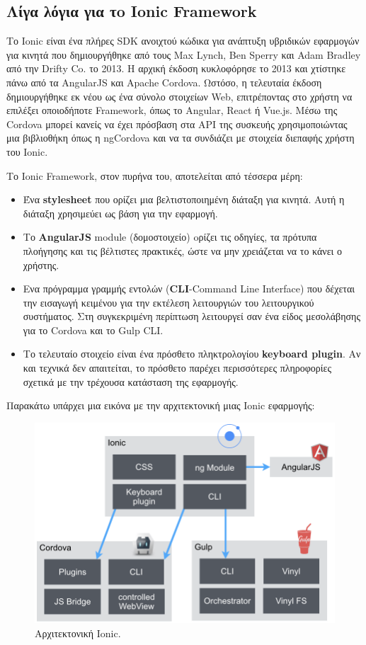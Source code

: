 \documentclass[a4paper,12pt]{article}
\begin{document}
		\subsection{Λίγα λόγια για τo Ionic Framework}
			Το Ionic είναι ένα πλήρες SDK ανοιχτού κώδικα για ανάπτυξη υβριδικών εφαρμογών για κινητά που δημιουργήθηκε από τους Max Lynch, Ben Sperry και Adam Bradley από την Drifty Co. το 
			2013. Η αρχική έκδοση κυκλοφόρησε το 2013 και χτίστηκε πάνω από τα AngularJS και Apache Cordova. Ωστόσο, η τελευταία έκδοση δημιουργήθηκε εκ νέου ως ένα σύνολο στοιχείων Web, 
			επιτρέποντας στο χρήστη να επιλέξει οποιοδήποτε Framework, όπως το Angular, React ή Vue.js. Μέσω της Cordova μπορεί κανείς να έχει πρόσβαση στα API της συσκευής χρησιμοποιώντας 
			μια βιβλιοθήκη όπως η ngCordova και να τα συνδιάζει με στοιχεία διεπαφής χρήστη του Ionic.

			Το Ionic Framework, στον πυρήνα του, αποτελείται από τέσσερα μέρη:

			\begin{itemize}
				\item Ένα \textbf{stylesheet} που ορίζει μια βελτιστοποιημένη διάταξη για κινητά. Αυτή η διάταξη χρησιμεύει ως βάση για την εφαρμογή.
				
				\item Το \textbf{AngularJS} module (δομοστοιχείο) oρίζει τις οδηγίες, τα πρότυπα πλοήγησης και τις βέλτιστες πρακτικές, ώστε να μην χρειάζεται να το κάνει ο χρήστης.
				
				\item Ενα πρόγραμμα γραμμής εντολών (\textbf{CLI}-Command Line Interface) που δέχεται την εισαγωγή κειμένου για την εκτέλεση λειτουργιών του λειτουργικού συστήματος.
				Στη συγκεκριμένη περίπτωση λειτουργεί σαν ένα είδος μεσολάβησης για το Cordova και το Gulp CLI.
				
				\item Το τελευταίο στοιχείο είναι ένα πρόσθετο πληκτρολογίου \textbf{keyboard plugin}. Αν και τεχνικά δεν απαιτείται, το πρόσθετο παρέχει περισσότερες πληροφορίες σχετικά με την τρέχουσα κατάσταση της εφαρμογής.
				
			\end{itemize}

			Παρακάτω υπάρχει μια εικόνα με την αρχιτεκτονική μιας Ionic εφαρμογής:
			\begin{figure}
				\caption{Αρχιτεκτονική Ionic.}
				\vspace*{0.5cm}
				\centering
				\includegraphics[width=0.8\linewidth]{ionic} 
			\end{figure}
		
\end{document}

